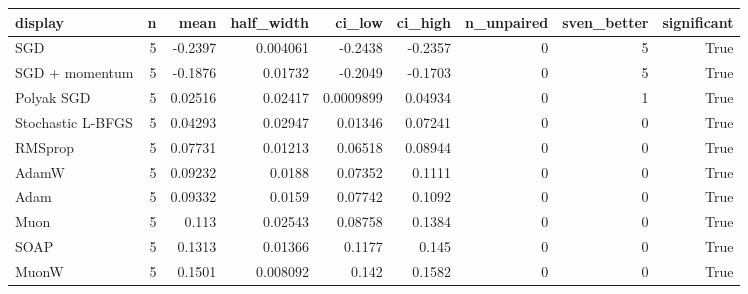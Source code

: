 \begin{tabular}{lrrrrrrrr}
\toprule
display & n & mean & half\_width & ci\_low & ci\_high & n\_unpaired & sven\_better & significant \\
\midrule
SGD & 5 & -0.2397 & 0.004061 & -0.2438 & -0.2357 & 0 & 5 & True \\
SGD + momentum & 5 & -0.1876 & 0.01732 & -0.2049 & -0.1703 & 0 & 5 & True \\
Polyak SGD & 5 & 0.02516 & 0.02417 & 0.0009899 & 0.04934 & 0 & 1 & True \\
Stochastic L-BFGS & 5 & 0.04293 & 0.02947 & 0.01346 & 0.07241 & 0 & 0 & True \\
RMSprop & 5 & 0.07731 & 0.01213 & 0.06518 & 0.08944 & 0 & 0 & True \\
AdamW & 5 & 0.09232 & 0.0188 & 0.07352 & 0.1111 & 0 & 0 & True \\
Adam & 5 & 0.09332 & 0.0159 & 0.07742 & 0.1092 & 0 & 0 & True \\
Muon & 5 & 0.113 & 0.02543 & 0.08758 & 0.1384 & 0 & 0 & True \\
SOAP & 5 & 0.1313 & 0.01366 & 0.1177 & 0.145 & 0 & 0 & True \\
MuonW & 5 & 0.1501 & 0.008092 & 0.142 & 0.1582 & 0 & 0 & True \\
\bottomrule
\end{tabular}
